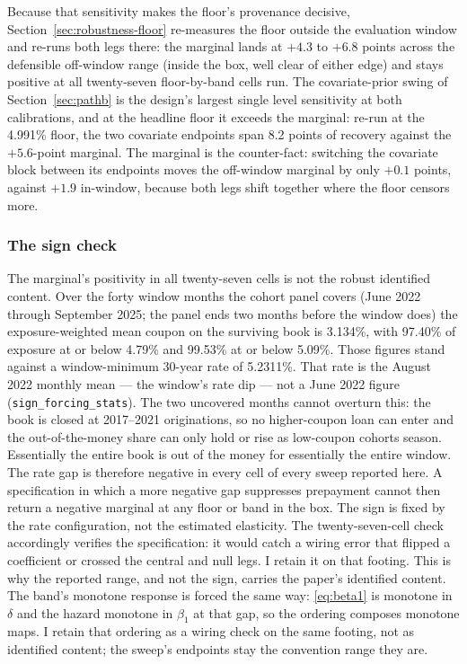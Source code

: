 \documentclass[12pt]{article}
\begin{document}
Because that sensitivity makes the floor's provenance decisive, Section~\ref{sec:robustness-floor} re-measures the floor outside the evaluation window and re-runs both legs there: the marginal lands at $+4.3$ to $+6.8$ points across the defensible off-window range (inside the box, well clear of either edge) and stays positive at all twenty-seven floor-by-band cells run. The covariate-prior swing of Section~\ref{sec:pathb} is the design's largest single level sensitivity at both calibrations, and at the headline floor it exceeds the marginal: re-run at the 4.991\% floor, the two covariate endpoints span 8.2 points of recovery against the $+5.6$-point marginal. The marginal is the counter-fact: switching the covariate block between its endpoints moves the off-window marginal by only $+0.1$ points, against $+1.9$ in-window, because both legs shift together where the floor censors more.

\subsubsection{The sign check}

The marginal's positivity in all twenty-seven cells is not the robust identified content. Over the forty window months the cohort panel covers (June 2022 through September 2025; the panel ends two months before the window does) the exposure-weighted mean coupon on the surviving book is 3.134\%, with 97.40\% of exposure at or below 4.79\% and 99.53\% at or below 5.09\%. Those figures stand against a window-minimum 30-year rate of 5.2311\%. That rate is the August 2022 monthly mean --- the window's rate dip --- not a June 2022 figure (\texttt{sign\_forcing\_stats}). The two uncovered months cannot overturn this: the book is closed at 2017--2021 originations, so no higher-coupon loan can enter and the out-of-the-money share can only hold or rise as low-coupon cohorts season. Essentially the entire book is out of the money for essentially the entire window. The rate gap is therefore negative in every cell of every sweep reported here. A specification in which a more negative gap suppresses prepayment cannot then return a negative marginal at any floor or band in the box. The sign is fixed by the rate configuration, not the estimated elasticity. The twenty-seven-cell check accordingly verifies the specification: it would catch a wiring error that flipped a coefficient or crossed the central and null legs. I retain it on that footing. This is why the reported range, and not the sign, carries the paper's identified content. The band's monotone response is forced the same way: \eqref{eq:beta1} is monotone in $\delta$ and the hazard monotone in $\beta_1$ at that gap, so the ordering composes monotone maps. I retain that ordering as a wiring check on the same footing, not as identified content; the sweep's endpoints stay the convention range they are.
\end{document}
